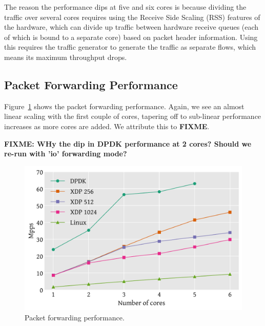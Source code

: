 \documentclass[10pt,sigconf]{acmart}
\begin{document}
The reason the performance dips at five and six cores is because dividing the
traffic over several cores requires using the Receive Side Scaling (RSS)
features of the hardware, which can divide up traffic between hardware receive
queues (each of which is bound to a separate core) based on packet header
information. Using this requires the traffic generator to generate the traffic
as separate flows, which means its maximum throughput drops.

\subsection{Packet Forwarding Performance}
\label{sec:pack-forw-perf}
Figure~\ref{fig:redirect-test} shows the packet forwarding performance. Again,
we see an almost linear scaling with the first couple of cores, tapering off to
sub-linear performance increases as more cores are added. We attribute this to
\textbf{FIXME}.

\textbf{FIXME: WHy the dip in DPDK performance at 2 cores? Should we re-run with
'io' forwarding mode?}


\begin{figure}[t]
\centering
\includegraphics[width=\linewidth]{figures/redirect-test.pdf}
\caption{\label{fig:redirect-test} Packet forwarding performance.}
\end{figure}
\end{document}
